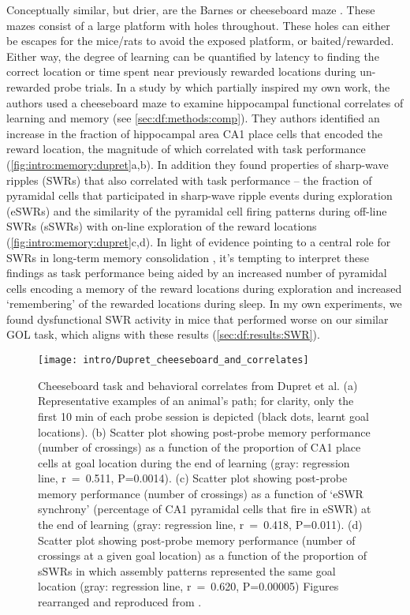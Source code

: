Conceptually similar, but drier, are the Barnes or cheeseboard maze \citep{Barnes1979}\citep{Kesner1991}\citep{Dupret2010a}.
These mazes consist of a large platform with holes throughout.
These holes can either be escapes for the mice/rats to avoid the exposed platform, or baited/rewarded.
Either way, the degree of learning can be quantified by latency to finding the correct location or time spent near previously rewarded locations during un-rewarded probe trials.
In a study by \citeauthor{Dupret2010a} which partially inspired my own work, the authors used a cheeseboard maze to examine hippocampal functional correlates of learning and memory (see \autoref{sec:df:methods:comp}).
They authors identified an increase in the fraction of hippocampal area CA1 place cells that encoded the reward location, the magnitude of which correlated with task performance (\autoref{fig:intro:memory:dupret}a,b).
In addition they found properties of sharp-wave ripples (SWRs) that also correlated with task performance -- the fraction of pyramidal cells that participated in sharp-wave ripple events during exploration (eSWRs) and the similarity of the pyramidal cell firing patterns during off-line SWRs (sSWRs) with on-line exploration of the reward locations (\autoref{fig:intro:memory:dupret}c,d).
In light of evidence pointing to a central role for SWRs in long-term memory consolidation \citep{Buzsaki2015}, it's tempting to interpret these findings as task performance being aided by an increased number of pyramidal cells encoding a memory of the reward locations during exploration and increased `remembering' of the rewarded locations during sleep.
In my own experiments, we found dysfunctional SWR activity in mice that performed worse on our similar \ac{GOL} task, which aligns with these results (\autoref{sec:df:results:SWR}).

\begin{figure}
	\centering
	\texttt{[image: intro/Dupret\_cheeseboard\_and\_correlates]}
	\caption[Cheeseboard task and behavioral correlates from Dupret et al.]{Cheeseboard task and behavioral correlates from Dupret et al.
	(a) Representative examples of an animal's path; for clarity, only the first 10 min of each probe session is depicted (black dots, learnt goal locations).
	(b) Scatter plot showing post-probe memory performance (number of crossings) as a function of the proportion of CA1 place cells at goal location during the end of learning (gray: regression line, r~=~0.511, P=0.0014).
	(c) Scatter plot showing post-probe memory performance (number of crossings) as a function of `eSWR synchrony' (percentage of CA1 pyramidal cells that fire in eSWR) at the end of learning (gray: regression line, r~=~0.418, P=0.011).
	(d) Scatter plot showing post-probe memory performance (number of crossings at a given goal location) as a function of the proportion of sSWRs in which assembly patterns represented the same goal location (gray: regression line, r~=~0.620, P=0.00005)
	Figures rearranged and reproduced from \citet{Dupret2010a}.}
	\label{fig:intro:memory:dupret}
\end{figure}

